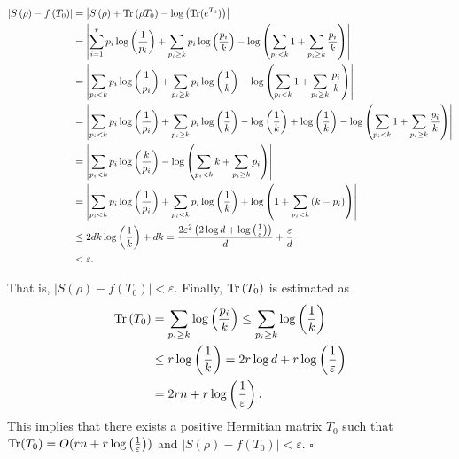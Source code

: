 \documentclass[aps,groupedaddress,superscriptaddress,amssymb,amsmath,amsbsy,amsfonts,twocolumn,pra]{revtex4}
\begin{document}
\begin{widetext}
\begin{align*}
\left|S\left(\rho\right) - f\left(T_0\right)\right| 
&= \left|S\left(\rho\right)+ \mbox{$\textnormal{Tr}$}\left(\rho T_0\right) - \log\left(\mbox{$\textnormal{Tr}$}(e^{T_0})\right)\right| \\
& = \left|\sum^r_{i=1} p_i\log\left(\frac{1}{p_i}\right) + \sum_{p_i \geq k} p_i\log\left(\frac{p_i}{k}\right) - \log\left(\sum_{p_i<k} 1 + \sum_{p_i \geq k} \frac{p_i}{k}\right)\right| \\
& = \left|\sum_{p_i < k} p_i\log\left(\frac{1}{p_i}\right) + \sum_{p_i \geq k} p_i\log\left(\frac{1}{k}\right)- \log\left(\sum_{p_i<k} 1 + \sum_{p_i \geq k} \frac{p_i}{k}\right)\right| \\
& = \left|\sum_{p_i < k} p_i\log\left(\frac{1}{p_i}\right) + \sum_{p_i \geq k} p_i\log\left(\frac{1}{k}\right)-\log\left(\frac{1}{k}\right)+\log\left(\frac{1}{k}\right)-\log\left(\sum_{p_i<k} 1 + \sum_{p_i \geq k} \frac{p_i}{k}\right)\right| \\
& = \left|\sum_{p_i < k} p_i\log\left(\frac{k}{p_i}\right) - \log\left(\sum_{p_i<k} k + \sum_{p_i \geq k} p_i\right)\right| \\
& = \left|\sum_{p_i < k} p_i\log\left(\frac{1}{p_i}\right) + \sum_{p_i < k} p_i\log\left(\frac{1}{k}\right) + \log\left(1 + \sum_{p_i<k} \left(k-p_i\right)\right)\right| \\
& \leq 2dk\log\left(\frac{1}{k}\right) + dk = \frac{2\varepsilon^2\left(2\log d + \log\left(\frac{1}{\varepsilon}\right)\right)}{d} + \frac{\varepsilon}{d} \\
&< \varepsilon.
\end{align*}
\end{widetext}

That is, $\left|S(\rho)-f(T_0)\right| < \varepsilon$. Finally, $\mbox{$\textnormal{Tr}$}\left(T_0\right)$ is estimated as
\begin{align*}
\mbox{$\textnormal{Tr}$}\left(T_0\right) 
& = \sum_{p_i \geq k} \log\left(\frac{p_i}{k}\right) \leq \sum_{p_i \geq k} \log\left(\frac{1}{k}\right) \\
& \leq r\log\left(\frac{1}{k}\right) = 2r\log d + r\log\left(\frac{1}{\varepsilon}\right) \\
&= 2rn+r\log\left(\frac{1}{\varepsilon}\right).
\end{align*}
This implies that there exists a positive Hermitian matrix $T_0$ such that $\mbox{$\textnormal{Tr}$}(T_0) = O(rn+r\log\left(\frac{1}{\varepsilon}\right))$ and $\left|S\left(\rho\right)-f\left(T_0\right)\right| < \varepsilon$. $\square$

\end{document}
